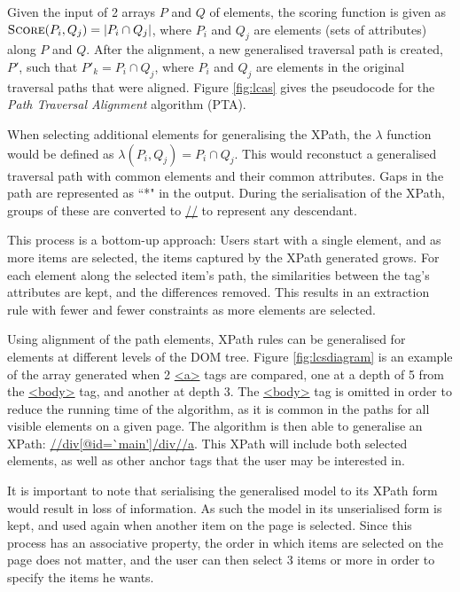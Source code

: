 Given the input of 2 arrays $P$ and $Q$ of elements, the scoring function is given as
$\textsc{Score}(P_i,Q_j) = |P_i \cap Q_j|$, where $P_i$ and $Q_j$ are elements (sets of
attributes) along $P$ and $Q$. After the alignment, a new generalised traversal path is
created, $P'$, such that $P'_k = P_i \cap Q_j$, where $P_i$ and $Q_j$ are elements in the
original traversal paths that were aligned. Figure \ref{fig:lcas} gives the pseudocode for the
\textit{Path Traversal Alignment} algorithm (PTA).


When selecting additional elements for generalising the XPath, the $\lambda$ function would be
defined as $\lambda(P_i,Q_j) = P_i \cap Q_j$. This would reconstuct a generalised traversal
path with common elements and their common attributes. Gaps in the path are represented as ``*"
 in the output. During the serialisation of the XPath, groups of these are converted to
 \url{//} to represent any descendant.

This process is a bottom-up approach: Users start with a single element, and as more items are
selected, the items captured by the XPath generated grows. For each element along the selected
item's path, the similarities between the tag's attributes are kept, and the differences
removed. This results in an extraction rule with fewer and fewer constraints as more elements
are selected.



Using alignment of the path elements, XPath rules can be generalised for elements at different
levels of the DOM tree. Figure \ref{fig:lcsdiagram} is an example of the array generated when 2
\url{<a>} tags are compared, one at a depth of 5 from the \url{<body>} tag, and another at
depth 3. The \url{<body>} tag is omitted in order to reduce the running time of the algorithm,
as it is common in the paths for all visible elements on a given page. The algorithm is then
able to generalise an XPath: \url{//div[@id=`main']/div//a}. This XPath will include both
selected elements, as well as other anchor tags that the user may be interested in.




It is important to note that serialising the generalised model to its XPath form would result
in loss of information. As such the model in its unserialised form is kept, and used again when
another item on the page is selected. Since this process has an associative property, the order
in which items are selected on the page does not matter, and the user can then select 3 items
or more in order to specify the items he wants.

